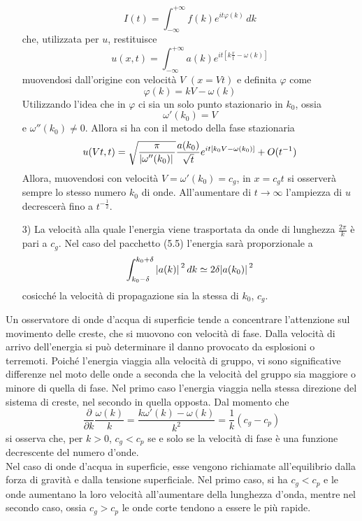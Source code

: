 \documentclass[a4paper,12pt, draft]{article}
\theoremstyle{break}
\let\phi\varphi
\numberwithin{equation}{section}
\begin{document}
\begin{itemize}
\begin{equation}
  I(t) = \int_{-\infty}^{+\infty} f(k)e^{it\phi(k)}\, dk
\end{equation}
che, utilizzata per \(u\), restituisce
\[
  u(x,t) = \int_{-\infty}^{+\infty} a(k)e^{it[k\frac{x}{t} - \omega(k)]}
\]
muovendosi dall'origine con velocità \(V\) \((x = Vt)\) e definita \(\phi\) come 
\[
  \phi(k) = kV - \omega(k)
\]
Utilizzando l'idea che in \(\phi\) ci sia un solo punto stazionario in \(k_0\), ossia
\[
  \omega'(k_0) = V
\]
e \(\omega''(k_0) \not = 0\). Allora si ha con il metodo della fase stazionaria 
\begin{equation}
  u(Vt, t) = \sqrt{\frac{\pi}{\abs*{\omega''(k_0)}}} \frac{a(k_0)}{\sqrt{t}}e^{it[k_0V - \omega(k_0)]} + O(t^{-1})
\end{equation}
Allora, muovendosi con velocità \(V = \omega'(k_0) = c_g\), in \(x = c_gt\) si osserverà sempre lo stesso numero \(k_0\) di onde. All'aumentare di \(t \to \infty\) l'ampiezza di \(u\) decrescerà fino a \(t^{-\frac{1}{2}}\).
\item[3)] La velocità alla quale l'energia viene trasportata da onde di lunghezza \(\frac{2\pi}{k}\) è pari a \(c_g\). Nel caso del pacchetto (5.5) l'energia sarà proporzionale a 
\[
\int_{k_0 - \delta}^{k_0 + \delta} \abs*{a(k)}^2 \, dk \simeq 2\delta\abs*{a(k_0)}^2  
\]
cosicché la velocità di propagazione sia la stessa di \(k_0\), \(c_g\).
\end{itemize}
Un osservatore di onde d'acqua di superficie tende a concentrare l'attenzione sul movimento delle creste, che si muovono con velocità di fase. Dalla velocità di arrivo dell'energia si può determinare il danno provocato da esplosioni o terremoti. Poiché l'energia viaggia alla velocità di gruppo, vi sono significative differenze nel moto delle onde a seconda che la velocità del gruppo sia maggiore o minore di quella di fase. Nel primo caso l'energia viaggia nella stessa direzione del sistema di creste, nel secondo in quella opposta. Dal momento che 
\[
  \frac{\partial}{\partial k} \frac{\omega (k)}{k} = \frac{k\omega'(k) - \omega(k)}{k^2} = \frac{1}{k}(c_g - c_p)
\]
si osserva che, per \(k > 0\), \(c_g < c_p\) se e solo se la velocità di fase è una funzione decrescente del numero d'onde. \\
Nel caso di onde d'acqua in superficie, esse vengono richiamate all'equilibrio dalla forza di gravità e dalla tensione superficiale. Nel primo caso, si ha \(c_g < c_p\) e le onde aumentano la loro velocità all'aumentare della lunghezza d'onda, mentre nel secondo caso, ossia \(c_g > c_p\) le onde corte tendono a essere le più rapide. 
\end{document}
